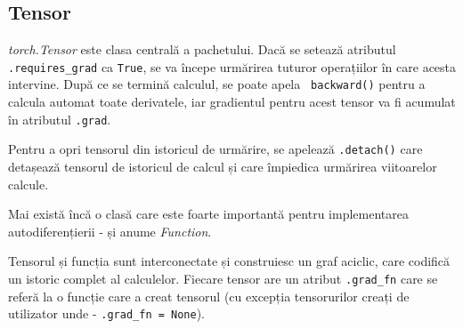 \subsection{Tensor}

\textit{torch.Tensor} este clasa centrală a pachetului. Dacă se setează atributul \texttt{.requires\_grad} ca  \texttt{True}, se va începe urmărirea tuturor operațiilor în care acesta intervine. După ce se termină calculul, se poate apela \texttt{ backward()} pentru a calcula automat toate derivatele, iar gradientul pentru acest tensor va fi acumulat în atributul \texttt{.grad}.

Pentru a opri tensorul din istoricul de urmărire, se apelează \texttt{.detach()} care detașează tensorul de istoricul de calcul și care împiedica urmărirea viitoarelor calcule.
 
Mai există încă o clasă care este foarte importantă pentru implementarea autodiferențierii - și anume \textit{Function}.

Tensorul și funcția sunt interconectate și construiesc un graf aciclic, care codifică un istoric complet al calculelor. Fiecare tensor are un atribut  \texttt{.grad\_fn} care se referă la o funcție care a creat tensorul (cu excepția tensorurilor creați de utilizator unde - \texttt{.grad\_fn = None}).